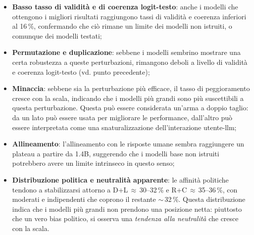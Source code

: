 \documentclass[../relazione.tex]{subfiles}
\begin{document}
\begin{itemize}
    \item \textbf{Basso tasso di validità e di coerenza logit-testo}: anche i modelli che ottengono i migliori risultati raggiungono tassi di validità e coerenza inferiori al 16\,\%, confermando che ciò rimane un limite dei modelli non istruiti, o comunque dei modelli testati;
    \item \textbf{Permutazione e duplicazione}: sebbene i modelli sembrino mostrare una certa robustezza a queste perturbazioni, rimangono deboli a livello di validità e coerenza logit-testo (vd. punto precedente);
    \item \textbf{Minaccia}: sebbene sia la perturbazione più efficace, il tasso di peggioramento cresce con la scala, indicando che i modelli più grandi sono più suscettibili a questa perturbazione. Questa può essere considerata un'arma a doppio taglio: da un lato può essere usata per migliorare le performance, dall'altro può essere interpretata come una snaturalizzazione dell'interazione utente-llm;
    \item \textbf{Allineamento}: l'allineamento con le risposte umane sembra raggiungere un plateau a partire da 1.4B, suggerendo che i modelli base non istruiti potrebbero avere un limite intrinseco in questo senso;
    \item \textbf{Distribuzione politica e neutralità apparente}: le affinità politiche tendono a stabilizzarsi attorno a D+L\,$\approx$\,30--32\,\% e R+C\,$\approx$\,35--36\,\%, con moderati e indipendenti che coprono il restante $\sim$\,32\,\%. Questa distribuzione indica che i modelli più grandi non prendono una posizione netta: piuttosto che un vero bias politico, si osserva una \emph{tendenza alla neutralità} che cresce con la scala.
\end{itemize}
\end{document}
